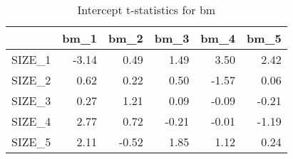 \begin{table}[ht]
\centering
\caption{Intercept t-statistics for bm} 
\begin{tabular}{rrrrrr}
  \hline
 & bm\_1 & bm\_2 & bm\_3 & bm\_4 & bm\_5 \\ 
  \hline
SIZE\_1 & -3.14 & 0.49 & 1.49 & 3.50 & 2.42 \\ 
  SIZE\_2 & 0.62 & 0.22 & 0.50 & -1.57 & 0.06 \\ 
  SIZE\_3 & 0.27 & 1.21 & 0.09 & -0.09 & -0.21 \\ 
  SIZE\_4 & 2.77 & 0.72 & -0.21 & -0.01 & -1.19 \\ 
  SIZE\_5 & 2.11 & -0.52 & 1.85 & 1.12 & 0.24 \\ 
   \hline
\end{tabular}
\end{table}


